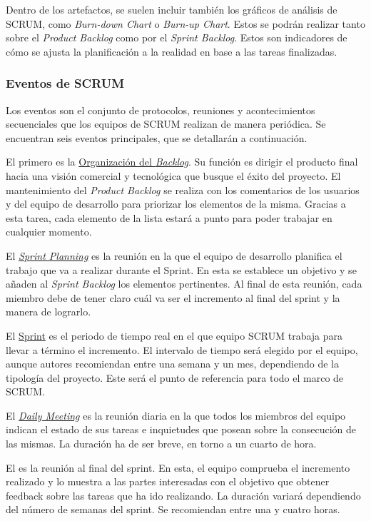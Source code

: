 Dentro de los artefactos, se suelen incluir también los gráficos de análisis de SCRUM, como \textit{Burn-down Chart} o \textit{Burn-up Chart}. Estos se podrán realizar tanto sobre el \textit{Product Backlog} como por el \textit{Sprint Backlog}. Estos son indicadores de cómo se ajusta la planificación a la realidad en base a las tareas finalizadas.

\subsubsection{Eventos de SCRUM}

Los eventos son el conjunto de protocolos, reuniones y acontecimientos secuenciales que los equipos de SCRUM realizan de manera periódica. Se encuentran seis eventos principales, que se detallarán a continuación.


El primero es la \underline{Organización del \textit{Backlog}}. Su función es dirigir el producto final hacia una visión comercial y tecnológica que busque el éxito del proyecto. El mantenimiento del \textit{Product Backlog} se realiza con los comentarios de los usuarios y del equipo de desarrollo para priorizar los elementos de la misma. Gracias a esta tarea, cada elemento de la lista estará a punto para poder trabajar en cualquier momento.

El \underline{\textit{Sprint Planning}} es la reunión en la que el equipo de desarrollo planifica el trabajo que va a realizar durante el Sprint. En esta se establece un objetivo y se añaden al \textit{Sprint Backlog} los elementos pertinentes. Al final de esta reunión, cada miembro debe de tener claro cuál va ser el incremento al final del sprint y la manera de lograrlo.

El \underline{Sprint} es el periodo de tiempo real en el que equipo SCRUM trabaja para llevar a término el incremento. El intervalo de tiempo será elegido por el equipo, aunque autores recomiendan entre una semana y un mes, dependiendo de la tipología del proyecto. Este será el punto de referencia para todo el marco de SCRUM.

El \underline{\textit{Daily Meeting}} es la reunión diaria en la que todos los miembros del equipo indican el estado de sus tareas e inquietudes que posean sobre la consecución de las mismas. La duración ha de ser breve, en torno a un cuarto de hora.

El \underline{} es la reunión al final del sprint. En esta, el equipo comprueba el incremento realizado y lo muestra a las partes interesadas con el objetivo que obtener feedback sobre las tareas que ha ido realizando. La duración variará dependiendo del número de semanas del sprint. Se recomiendan entre una y cuatro horas.

